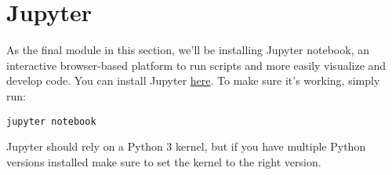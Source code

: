 \documentclass{article}
\begin{document}
\section{Jupyter}
As the final module in this section, we'll be installing Jupyter notebook, an interactive browser-based platform to run scripts and more easily visualize and develop code. You can install Jupyter \href{https://jupyter.org/}{here}. To make sure it's working, simply run:

 \begin{lstlisting}[escapechar=|]
 jupyter notebook
\end{lstlisting}

Jupyter should rely on a Python 3 kernel, but if you have multiple Python versions installed make sure to set the kernel to the right version.
\end{document}
